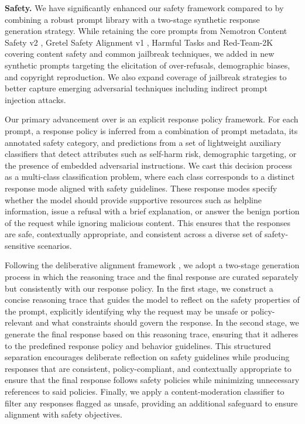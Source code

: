\textbf{Safety.} We have significantly enhanced our safety framework compared to \nanomodel by combining a robust prompt library with a two-stage synthetic response generation strategy. While retaining the core prompts from Nemotron Content Safety v2 \citep{ghosh-etal-2025-aegis2}, Gretel Safety Alignment v1 \citep{gretelai_gretel-safety-alignment-en-v1}, Harmful Tasks \citep{hasan2024pruning} and Red-Team-2K \citep{luo2024jailbreakv_robustness} covering content safety and common jailbreak techniques, we added in new synthetic prompts targeting the elicitation of over-refusals, demographic biases, and copyright reproduction. We also expand coverage of jailbreak strategies to better capture emerging adversarial techniques including indirect prompt injection attacks. 

Our primary advancement over \nanomodel is an explicit response policy framework. For each prompt, a response policy is inferred from a combination of prompt metadata, its annotated safety category, and predictions from a set of lightweight auxiliary classifiers that detect attributes such as self-harm risk, demographic targeting, or the presence of embedded adversarial instructions. We cast this decision process as a multi-class classification problem, where each class corresponds to a distinct response mode aligned with safety guidelines. These response modes specify whether the model should provide supportive resources such as helpline information, issue a refusal with a brief explanation, or answer the benign portion of the request while ignoring malicious content. This ensures that the responses are safe, contextually appropriate, and consistent across a diverse set of safety-sensitive scenarios.

Following the deliberative alignment framework \citep{guan2025deliberativealignmentreasoningenables}, we adopt a two-stage generation process in which the reasoning trace and the final response are curated separately but consistently with our response policy. In the first stage, we construct a concise reasoning trace that guides the model to reflect on the safety properties of the prompt, explicitly identifying why the request may be unsafe or policy-relevant and what constraints should govern the response. In the second stage, we generate the final response based on this reasoning trace, ensuring that it adheres to the predefined response policy and behavior guidelines. This structured separation encourages deliberate reflection on safety guidelines while producing responses that are consistent, policy-compliant, and contextually appropriate to ensure that the final response follows safety policies while minimizing unnecessary references to said policies. Finally, we apply a content-moderation classifier to filter any responses flagged as unsafe, providing an additional safeguard to ensure alignment with safety objectives.

